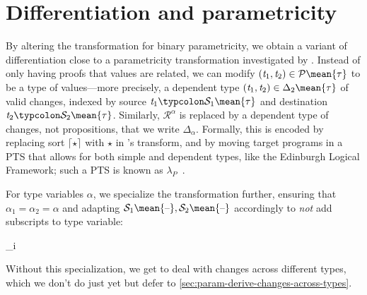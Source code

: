 \section{Differentiation and parametricity}
\label{sec:differentiation-dep-types-stlc}
By altering the transformation for binary parametricity, we obtain a variant of
differentiation close to a parametricity transformation investigated by \citet*{Bernardy10}.
Instead of only having proofs that values are related, we can modify \ensuremath{(\Varid{t}_{1},\Varid{t}_{2})\in \mathcal{P}\mean{\tau}} to be a type of values---more precisely, a dependent type \ensuremath{(\Varid{t}_{1},\Varid{t}_{2})\in \Delta_2\mean{\tau}} of valid changes, indexed by source \ensuremath{\Varid{t}_{1}\typcolon\mathcal{S}_1 \mean{\tau}} and destination \ensuremath{\Varid{t}_{2}\typcolon\mathcal{S}_2 \mean{\tau}}. Similarly, \ensuremath{\mathcal{R}^\alpha} is replaced by a dependent type of changes, not
propositions, that we write \ensuremath{\Delta_\alpha}.
Formally, this is encoded by replacing sort \ensuremath{\lceil \star \rceil} with \ensuremath{\star} in
\citet{Bernardy2011realizability}'s transform, and by moving
target programs in a PTS that allows for both simple and dependent types, like
the Edinburgh Logical Framework; such a PTS is known as
\ensuremath{\lambda_P}~\citep{Barendregt1992lambda}.

For type variables \ensuremath{\alpha}, we specialize the transformation further, ensuring
that \ensuremath{\alpha_{1}\mathrel{=}\alpha_{2}\mathrel{=}\alpha} and adapting \ensuremath{\mathcal{S}_1 \mean{\text{\textendash}},\mathcal{S}_2 \mean{\text{\textendash}}} accordingly to \emph{not} add
subscripts to type variable:
\begin{hscode}\SaveRestoreHook
{}%
%
%
\>[3]{}_i \mean{\alpha}\mathrel{=}\alpha{}\<[E]%
\ColumnHook
\end{hscode}\resethooks
Without this
specialization, we get to deal with changes across different types, which we
don't do just yet but defer to \cref{sec:param-derive-changes-across-types}.

